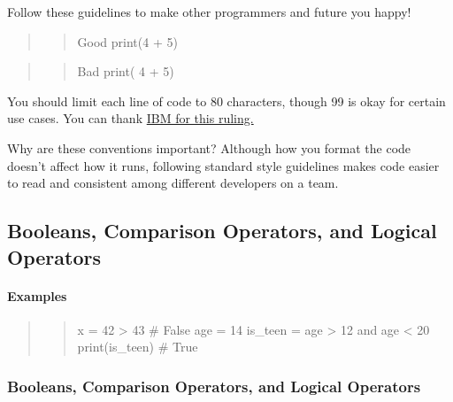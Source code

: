 \documentclass[11pt]{article}
\begin{document}
Follow these guidelines to make other programmers and future you happy!

\begin{quote}
\begin{quote}
Good print(4 + 5)
\end{quote}
\end{quote}

\begin{quote}
\begin{quote}
Bad print( 4 + 5)
\end{quote}
\end{quote}

You should limit each line of code to 80 characters, though 99 is okay
for certain use cases. You can thank
\href{https://softwareengineering.stackexchange.com/questions/148677/why-is-80-characters-the-standard-limit-for-code-width}{IBM
for this ruling.}

Why are these conventions important? Although how you format the code
doesn't affect how it runs, following standard style guidelines makes
code easier to read and consistent among different developers on a team.

    \hypertarget{booleans-comparison-operators-and-logical-operators}{%
\subsection{Booleans, Comparison Operators, and Logical
Operators}\label{booleans-comparison-operators-and-logical-operators}}

    \hypertarget{examples}{%
\paragraph{Examples}\label{examples}}

\begin{quote}
\begin{quote}
x = 42 \textgreater{} 43 \# False age = 14 is\_teen = age \textgreater{}
12 and age \textless{} 20 print(is\_teen) \# True
\end{quote}
\end{quote}

    \hypertarget{booleans-comparison-operators-and-logical-operators}{%
\subsubsection{Booleans, Comparison Operators, and Logical
Operators}\label{booleans-comparison-operators-and-logical-operators}}
\end{document}
